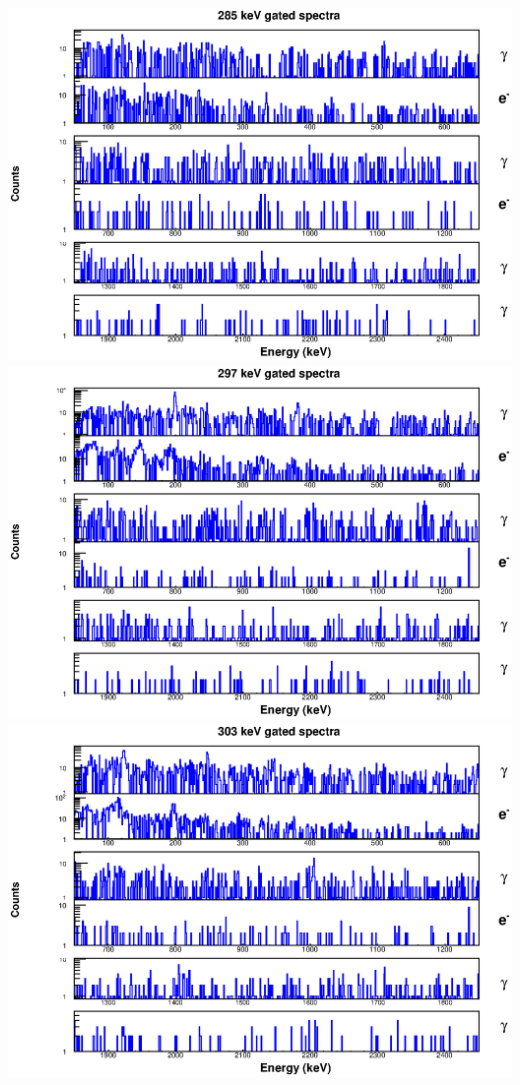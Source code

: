 \includegraphics[scale=0.8]{154Gd_Appendix/285_combined.eps}
\includegraphics[scale=0.8]{154Gd_Appendix/297_combined.eps}
\includegraphics[scale=0.8]{154Gd_Appendix/303_combined.eps}
